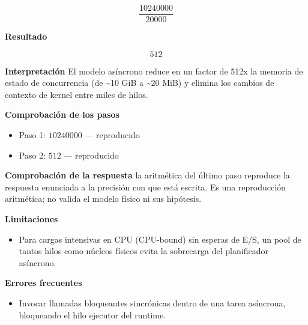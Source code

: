 \documentclass{book}
\begin{document}
\begin{tcolorbox}[title={Problema resuelto}, studiumworked, breakable]
\begin{enumerate}
\[
\frac{10240000}{20000}
\]
\end{enumerate}

\noindent\textbf{Resultado}

\[
512
\]

\noindent\textbf{Interpretación}
El modelo asíncrono reduce en un factor de 512x la memoria de estado de concurrencia (de \textasciitilde{}10 GiB a \textasciitilde{}20 MiB) y elimina los cambios de contexto de kernel entre miles de hilos.

\noindent\textbf{Comprobación de los pasos}
\begin{itemize}
\item Paso 1: $10240000$ — reproducido
\item Paso 2: $512$ — reproducido
\end{itemize}

\noindent\textbf{Comprobación de la respuesta} la aritmética del último paso reproduce la respuesta enunciada a la precisión con que está escrita. Es una reproducción aritmética; no valida el modelo físico ni sus hipótesis.

\noindent\textbf{Limitaciones}
\begin{itemize}
\item Para cargas intensivas en CPU (CPU-bound) sin esperas de E/S, un pool de tantos hilos como núcleos físicos evita la sobrecarga del planificador asíncrono.
\end{itemize}

\noindent\textbf{Errores frecuentes}
\begin{itemize}
\item Invocar llamadas bloqueantes sincrónicas dentro de una tarea asíncrona, bloqueando el hilo ejecutor del runtime.
\end{itemize}
\end{tcolorbox}
\end{document}

